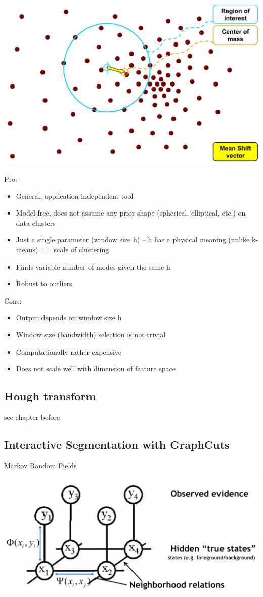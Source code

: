 \includegraphics[width=\columnwidth]{pictures/meanshift}

Pro:
\begin{itemize}
	\item General, application-independent tool
	\item Model-free, does not assume any prior shape (spherical, elliptical, etc.) on data clusters
	\item Just a single parameter (window size h) – h has a physical meaning (unlike k-means) == scale of clustering
	\item Finds variable number of modes given the same h 
	\item Robust to outliers
\end{itemize}
Cons:
\begin{itemize}
	\item Output depends on window size h
	\item Window size (bandwidth) selection is not trivial
	\item Computationally rather expensive
	\item Does not scale well with dimension of feature space
\end{itemize}

\subsection{Hough transform}
see chapter before

\subsection{Interactive Segmentation with GraphCuts}
Markov Random Fields

\includegraphics[width=\columnwidth]{pictures/markovfields}

